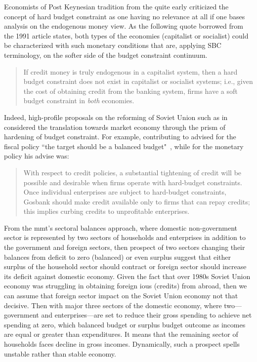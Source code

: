 Economists of Post Keynesian tradition from the quite early criticized
the concept of hard budget constraint as one having no relevance at all
if one bases analysis on the endogenous money view. As the following
quote borrowed from the 1991 article states, both types of the economies
(capitalist or socialist) could be characterized with such monetary
conditions that are, applying SBC terminology, on the softer side of the
budget constraint continuum.

\begin{quote}
 If credit money is truly endogenous in a capitalist system, then a
 hard budget constraint does not exist in capitalist or socialist
 systems; i.e., given the cost of obtaining credit from the banking
 system, firms have a soft budget constraint in \textit{both} economies.
 \citep[p.~330, emphasis added]{szego}
\end{quote}

Indeed, high-profile proposals on the reforming of Soviet Union such as
in \citep{peck} considered the translation towards market economy through the
prism of hardening of budget constraint. For example, \citeauthor{nordhaus}
contributing to \cite{peck} advised for the fiscal policy ``the target should
be a balanced budget"~\citep[p.~104]{nordhaus}, while for the monetary policy
his advise was:

\begin{quote}
 With respect to credit policies, a substantial tightening of credit
 will be possible and desirable when firms operate with hard-budget
 constraints. Once individual enterprises are subject to hard-budget
 constraints, Gosbank should make credit available only to firms that
 can repay credits; this implies curbing credits to unprofitable
 enterprises.~\citep[p.~108]{nordhaus}
\end{quote}

From the \ac{mmt}'s sectoral balances approach, where domestic non-government
sector is represented by two sectors of households and enterprises in
addition to the government and foreign sectors, then prospect of two
sectors changing their balances from deficit to zero (balanced) or even
surplus suggest that either surplus of the household sector should
contract or foreign sector should increase its deficit against domestic
economy. Given the fact that over 1980s Soviet Union economy was
struggling in obtaining foreign \acp{iou} (credits) from abroad, then we can
assume that foreign sector impact on the Soviet Union economy not that
decisive. Then with major three sectors of the domestic economy, where
two---government and enterprises---are set to reduce their gross
spending to achieve net spending at zero, which balanced budget or
surplus budget outcome as incomes are equal or greater than
expenditures. It means that the remaining sector of households faces
decline in gross incomes. Dynamically, such a prospect spells unstable
rather than stable economy.

